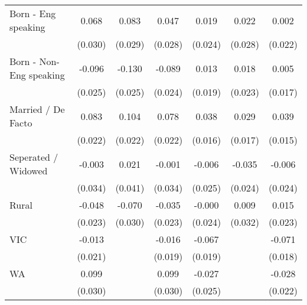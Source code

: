 {\begin{tabular}{l*{6}{c}}
Born - Eng speaking &       0.068\sym{**} &       0.083\sym{***}&       0.047\sym{*}  &       0.019         &       0.022         &       0.002         \\
                    &     (0.030)         &     (0.029)         &     (0.028)         &     (0.024)         &     (0.028)         &     (0.022)         \\
Born - Non-Eng speaking&      -0.096\sym{***}&      -0.130\sym{***}&      -0.089\sym{***}&       0.013         &       0.018         &       0.005         \\
                    &     (0.025)         &     (0.025)         &     (0.024)         &     (0.019)         &     (0.023)         &     (0.017)         \\
Married / De Facto  &       0.083\sym{***}&       0.104\sym{***}&       0.078\sym{***}&       0.038\sym{**} &       0.029\sym{*}  &       0.039\sym{**} \\
                    &     (0.022)         &     (0.022)         &     (0.022)         &     (0.016)         &     (0.017)         &     (0.015)         \\
Seperated / Widowed &      -0.003         &       0.021         &      -0.001         &      -0.006         &      -0.035         &      -0.006         \\
                    &     (0.034)         &     (0.041)         &     (0.034)         &     (0.025)         &     (0.024)         &     (0.024)         \\
Rural               &      -0.048\sym{**} &      -0.070\sym{**} &      -0.035         &      -0.000         &       0.009         &       0.015         \\
                    &     (0.023)         &     (0.030)         &     (0.023)         &     (0.024)         &     (0.032)         &     (0.023)         \\
VIC                 &      -0.013         &                     &      -0.016         &      -0.067\sym{***}&                     &      -0.071\sym{***}\\
                    &     (0.021)         &                     &     (0.019)         &     (0.019)         &                     &     (0.018)         \\
WA                  &       0.099\sym{***}&                     &       0.099\sym{***}&      -0.027         &                     &      -0.028         \\
                    &     (0.030)         &                     &     (0.030)         &     (0.025)         &                     &     (0.022)         \\

\end{tabular}}
